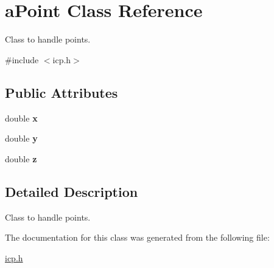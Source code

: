 \hypertarget{classaPoint}{}\section{a\+Point Class Reference}
\label{classaPoint}


Class to handle points.  




{\ttfamily \#include $<$icp.\+h$>$}

\subsection*{Public Attributes}
\begin{DoxyCompactItemize}
\item 
\mbox{\label{classaPoint_af1ef5dd62d225d264aceeb0728ac0ba7}} 
double {\bfseries x}
\item 
\mbox{\label{classaPoint_aa8c73634208dd93e5572ca15e546ad39}} 
double {\bfseries y}
\item 
\mbox{\label{classaPoint_a0e221ad7ffa17d0c1dedd3073194cdc0}} 
double {\bfseries z}
\end{DoxyCompactItemize}


\subsection{Detailed Description}
Class to handle points. 

The documentation for this class was generated from the following file\+:\begin{DoxyCompactItemize}
\item 
\hyperlink{icp_8h}{icp.\+h}\end{DoxyCompactItemize}
